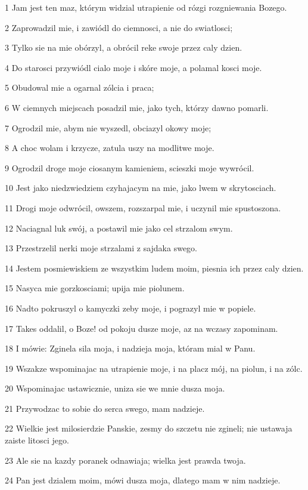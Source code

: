 \par 1 Jam jest ten maz, którym widzial utrapienie od rózgi rozgniewania Bozego.
\par 2 Zaprowadzil mie, i zawiódl do ciemnosci, a nie do swiatlosci;
\par 3 Tylko sie na mie obórzyl, a obrócil reke swoje przez caly dzien.
\par 4 Do starosci przywiódl cialo moje i skóre moje, a polamal kosci moje.
\par 5 Obudowal mie a ogarnal zólcia i praca;
\par 6 W ciemnych miejscach posadzil mie, jako tych, którzy dawno pomarli.
\par 7 Ogrodzil mie, abym nie wyszedl, obciazyl okowy moje;
\par 8 A choc wolam i krzycze, zatula uszy na modlitwe moje.
\par 9 Ogrodzil droge moje ciosanym kamieniem, scieszki moje wywrócil.
\par 10 Jest jako niedzwiedziem czyhajacym na mie, jako lwem w skrytosciach.
\par 11 Drogi moje odwrócil, owszem, rozszarpal mie, i uczynil mie spustoszona.
\par 12 Naciagnal luk swój, a postawil mie jako cel strzalom swym.
\par 13 Przestrzelil nerki moje strzalami z sajdaka swego.
\par 14 Jestem posmiewiskiem ze wszystkim ludem moim, piesnia ich przez caly dzien.
\par 15 Nasyca mie gorzkosciami; upija mie piolunem.
\par 16 Nadto pokruszyl o kamyczki zeby moje, i pograzyl mie w popiele.
\par 17 Takes oddalil, o Boze! od pokoju dusze moje, az na wczasy zapominam.
\par 18 I mówie: Zginela sila moja, i nadzieja moja, któram mial w Panu.
\par 19 Wszakze wspominajac na utrapienie moje, i na placz mój, na piolun, i na zólc.
\par 20 Wspominajac ustawicznie, uniza sie we mnie dusza moja.
\par 21 Przywodzac to sobie do serca swego, mam nadzieje.
\par 22 Wielkie jest milosierdzie Panskie, zesmy do szczetu nie zgineli; nie ustawaja zaiste litosci jego.
\par 23 Ale sie na kazdy poranek odnawiaja; wielka jest prawda twoja.
\par 24 Pan jest dzialem moim, mówi dusza moja, dlatego mam w nim nadzieje.
